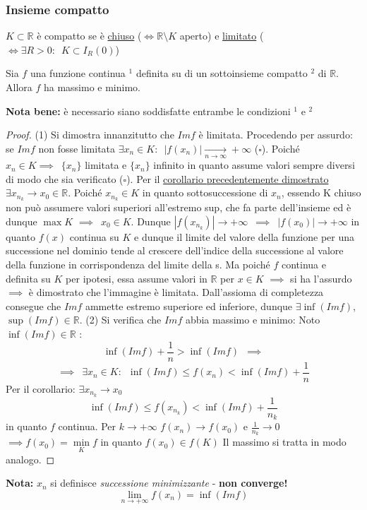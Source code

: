 \documentclass[10pt, oneside]{book}
\theoremstyle{plain}
\begin{document}
\subsubsection{Insieme compatto}
\begin{defin}
$K \subset \mathbb{R}$ è compatto se è \underline{chiuso} ($\Leftrightarrow \mathbb{R} \setminus K$ aperto) e \underline{limitato} ($\Leftrightarrow \exists R > 0 : \enspace K \subset I_R(0)$)
\end{defin}
\hypertarget{weierstrass}{\begin{ther}
Sia $f$ una funzione continua $^1$ definita su di un sottoinsieme compatto $^2$ di $\mathbb{R}$. 
Allora $f$ ha massimo e minimo.
\end{ther}}
\textbf{Nota bene: } è necessario siano soddisfatte entrambe le condizioni $^1$ e $^2$
\begin{proof}
    (1) Si dimostra innanzitutto che $Im f$ è limitata. Procedendo per assurdo: se $Im f$ non fosse limitata $\exists x_n \in K : \enspace |f(x_n)| \xrightarrow[n \rightarrow \infty]{} + \infty$ ($\square$).
    Poiché $x_n \in K \implies \enspace \{x_n\}$ limitata e $\{x_n\}$ infinito in quanto assume valori sempre diversi di modo che sia verificato ($\square$). Per il \hyperlink{corollaier}{corollario precedentemente dimostrato} $\exists x_{n_k} \rightarrow x_0 \in \mathbb{R}$. \newline Poiché $x_{n_k} \in K$ in quanto sottosuccessione di $x_n$, essendo K chiuso non può assumere valori superiori all'estremo sup, che fa parte dell'insieme ed è dunque $\max K$ $\implies \enspace x_0 \in K$. 
    \newline Dunque $|f(x_{n_k})| \longrightarrow + \infty \enspace \implies \enspace |f(x_0)| \longrightarrow + \infty$ in quanto $f(x)$ continua su $K$ e dunque il limite del valore della funzione per una successione nel dominio tende al crescere dell'indice della successione al valore della funzione in corrispondenza del limite della s. Ma poiché $f$ continua e definita su $K$ per ipotesi, essa assume valori in $\mathbb{R}$ per $x \in K$ $\implies$ si ha l'assurdo $\implies$ è dimostrato che l'immagine è limitata. \newline 
    Dall'assioma di completezza consegue che $Im f$ ammette estremo superiore ed inferiore, dunque $\exists \inf(Im f)$, $\sup(Im f) \in \mathbb{R}$. \newline
    (2) Si verifica che $Im f$ abbia massimo e minimo: \newline
    Noto $\inf(Im f) \in \mathbb{R}$ :
    \[\inf(Im f) + \frac{1}{n} > \inf(Im f) \enspace \implies\]
    \[\implies \enspace \exists x_n \in K : \enspace \inf(Im f) \leq f(x_n) < \inf(Im f) + \frac{1}{n}\]
    Per il corollario: $\exists x_{n_k} \rightarrow x_0$
    \[\inf(Im f) \leq f(x_{n_k}) < \inf(Im f) + \frac{1}{n_k}\]
    in quanto $f$ continua. Per $k \rightarrow + \infty$ $f(x_n) \rightarrow f(x_0)$ e $\frac{1}{n_k} \rightarrow 0$ $\implies f(x_0) = \min \limits_K f$ in quanto $f(x_0) \in f(K)$ \newline Il massimo si tratta in modo analogo.
\end{proof}
\textbf{Nota: } $x_n$ si definisce \textit{successione minimizzante} - \textbf{non converge!}
\[\lim \limits_{n \rightarrow + \infty} f(x_n)= \inf(Im f)\]
\end{document}
